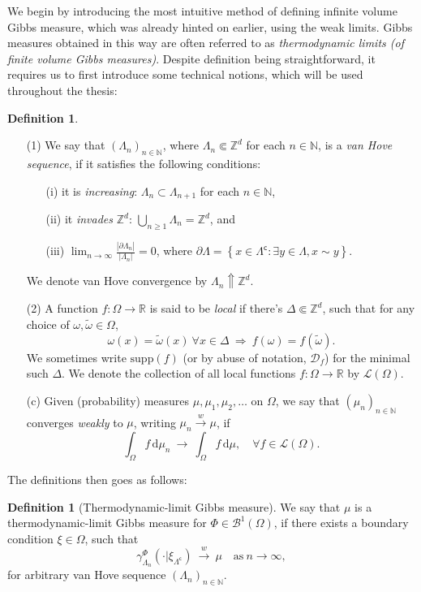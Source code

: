 \documentclass[12pt]{article}
\newcommand{\BB}{\mathscr{B}}
\newcommand{\D}{\mathcal{D}}
\renewcommand{\d}{\mathrm{d}}
\newcommand{\Loc}{\mathcal{L}}
\newcommand{\N}{\mathbb{N}}
\newcommand{\R}{\mathbb{R}}
\newcommand{\Z}{\mathbb{Z}}
\newcommand{\set}[1]{\left\{#1\right\}}
\newcommand{\ra}{\rightarrow}
\newcommand{\pika}{\boldsymbol{\cdot}}
\newcommand{\1}{\mathbbm{1}}
\renewcommand{\c}{\mathsf{c}}
\newcommand{\supp}{\mathrm{supp}}
\newcommand{\5}{\vspace{0.5cm}}
\renewcommand{\tilde}{\widetilde}
\theoremstyle{definition}
\newtheorem{df}[thm]{Definition}
\begin{document}
We begin by introducing the most intuitive method of defining infinite volume Gibbs measure, which was already hinted on earlier, using the weak limits. Gibbs measures obtained in this way are often referred to as \textit{thermodynamic limits (of finite volume Gibbs measures)}. Despite definition being straightforward, it requires us to first introduce some technical notions, which will be used throughout the thesis:

\begin{df}
~
\begin{itemize}
	\item[(1)] We say that $(\Lambda_n)_{n\in\N}$, where $\Lambda_n\Subset\Z^d$ for each $n\in\N$, is a \textit{van Hove sequence}, if it satisfies the following conditions:
	\begin{itemize}
		\item[(i)] it is \textit{increasing}: $\Lambda_n\subset\Lambda_{n+1}$ for each $n\in\N$,
		\item[(ii)] it \textit{invades} $\Z^d$: $\bigcup_{n\geq 1}\Lambda_n=\Z^d$, and
		\item[(iii)] $\lim_{n\ra\infty}\frac{|\partial\Lambda_n|}{|\Lambda_n|}=0$, where $\partial \Lambda=\set{x\in\Lambda^\c:\exists y\in\Lambda,x\sim y}$.
	\end{itemize}
	We denote van Hove convergence by $\Lambda_n\Uparrow\Z^d$.
	\item[(2)] A function $f:\Omega\ra\R$ is said to be \textit{local} if there's $\Delta\Subset\Z^d$, such that for any choice of $\omega,\tilde{\omega}\in\Omega$, 
	$$\omega(x)=\tilde{\omega}(x)~\forall x\in\Delta ~\Longrightarrow~ f(\omega)=f(\tilde{\omega}).$$
	We sometimes write $\supp(f)$ (or by abuse of notation, $\D_f$) for the minimal such $\Delta$. We denote the collection of all local functions $f:\Omega\ra\R$ by $\Loc(\Omega)$.
	\item[(c)] Given (probability) measures $\mu,\mu_1,\mu_2,\ldots$ on $\Omega$, we say that $(\mu_n)_{n\in\N}$ converges \textit{weakly} to $\mu$, writing $\mu_n\xrightarrow{w}\mu$, if
	$$\int_\Omega f\,\d\mu_n ~\ra~ \int_\Omega f\,\d\mu, \quad \forall f\in\Loc(\Omega).$$
\end{itemize}
\end{df}

The definitions then goes as follows:

\begin{df}[Thermodynamic-limit Gibbs measure]
We say that $\mu$ is a thermo\-dynamic-limit Gibbs measure for $\Phi\in\BB^1(\Omega)$, if there exists a boundary condition $\xi\in\Omega$, such that
$$\gamma_{\Lambda_n}^\Phi(\pika|\xi_{\Lambda^\c}) ~\xrightarrow{w}~ \mu \quad \text{as}~n\ra\infty,$$
for arbitrary van Hove sequence $(\Lambda_n)_{n\in\N}$.
\end{df}
\end{document}
